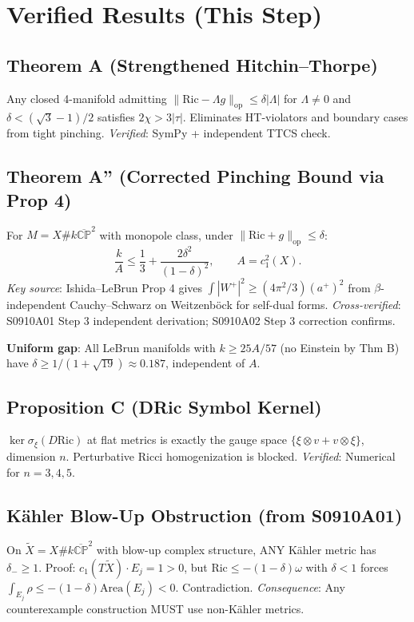 
\section{Verified Results (This Step)}

\subsection{Theorem A (Strengthened Hitchin--Thorpe)}
Any closed 4-manifold admitting $\|\mathrm{Ric} - \Lambda g\|_{\mathrm{op}} \leq \delta|\Lambda|$
for $\Lambda \neq 0$ and $\delta < (\sqrt{3}-1)/2$ satisfies $2\chi > 3|\tau|$.
Eliminates HT-violators and boundary cases from tight pinching.
\emph{Verified}: SymPy + independent TTCS check.

\subsection{Theorem A'' (Corrected Pinching Bound via Prop 4)}
For $M = X \# k\overline{\mathbb{CP}}^2$ with monopole class, under $\|\mathrm{Ric}+g\|_{\mathrm{op}} \leq \delta$:
\[
\frac{k}{A} \leq \frac{1}{3} + \frac{2\delta^2}{(1-\delta)^2},
\qquad A = c_1^2(X).
\]
\emph{Key source}: Ishida--LeBrun Prop 4 gives $\int|W^+|^2 \geq (4\pi^2/3)(a^+)^2$
from $\beta$-independent Cauchy--Schwarz on Weitzenb\"ock for self-dual forms.
\emph{Cross-verified}: S0910A01 Step 3 independent derivation; S0910A02 Step 3 correction confirms.

\textbf{Uniform gap}: All LeBrun manifolds with $k \geq 25A/57$ (no Einstein by Thm B) have
$\delta \geq 1/(1+\sqrt{19}) \approx 0.187$, independent of $A$.

\subsection{Proposition C (DRic Symbol Kernel)}
$\ker\sigma_\xi(D\mathrm{Ric})$ at flat metrics is exactly the gauge space
$\{\xi\otimes v + v\otimes\xi\}$, dimension $n$. Perturbative Ricci homogenization is blocked.
\emph{Verified}: Numerical for $n=3,4,5$.

\subsection{K\"ahler Blow-Up Obstruction (from S0910A01)}
On $\widetilde{X} = X\#k\overline{\mathbb{CP}}^2$ with blow-up complex structure,
ANY K\"ahler metric has $\delta_- \geq 1$. Proof: $c_1(T\widetilde{X})\cdot E_j = 1 > 0$,
but $\mathrm{Ric} \leq -(1-\delta)\omega$ with $\delta < 1$ forces 
$\int_{E_j}\rho \leq -(1-\delta)\mathrm{Area}(E_j) < 0$. Contradiction.
\emph{Consequence}: Any counterexample construction MUST use non-K\"ahler metrics.


